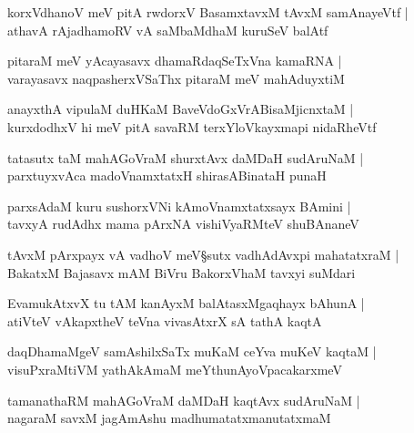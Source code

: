 \begin{shloka}
korxVdhanoV meV pitA rwdorxV BasamxtavxM tAvxM samAnayeVtf |\\
athavA rAjadhamoRV vA saMbaMdhaM kuruSeV balAtf
\end{shloka}

\begin{shloka}
pitaraM meV yAcayasavx dhamaRdaqSeTxVna kamaRNA |\\
varayasavx naqpasherxVSaThx pitaraM meV mahAduyxtiM 
\end{shloka}

\begin{shloka}
anayxthA vipulaM duHKaM BaveVdoGxVrABisaMjicnxtaM |\\
kurxdodhxV hi meV pitA savaRM terxYloVkayxmapi nidaRheVtf
\end{shloka}

\begin{shloka}
tatasutx taM mahAGoVraM shurxtAvx daMDaH sudAruNaM |\\
parxtuyxvAca madoVnamxtatxH shirasABinataH punaH 
\end{shloka}

\begin{shloka}
parxsAdaM kuru sushorxVNi kAmoVnamxtatxsayx BAmini |\\
tavxyA rudAdhx mama pArxNA vishiVyaRMteV shuBAnaneV 
\end{shloka}

\begin{shloka}
tAvxM pArxpayx vA vadhoV meV\S sutx vadhAdAvxpi mahatatxraM |\\
BakatxM Bajasavx mAM BiVru BakorxVhaM tavxyi suMdari
\end{shloka}

\begin{shloka}
EvamukAtxvX tu tAM kanAyxM balAtasxMgaqhayx bAhunA |\\
atiVteV vAkapxtheV teVna vivasAtxrX sA tathA kaqtA 
\end{shloka}

\begin{shloka}
daqDhamaMgeV samAshilxSaTx muKaM ceYva muKeV kaqtaM |\\
visuPxraMtiVM yathAkAmaM meYthunAyoVpacakarxmeV 
\end{shloka}

\begin{shloka}
tamanathaRM mahAGoVraM daMDaH kaqtAvx sudAruNaM |\\
nagaraM savxM jagAmAshu madhumatatxmanutatxmaM 
\end{shloka}

